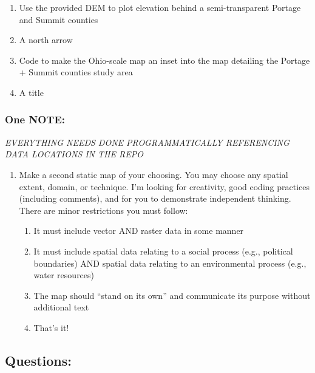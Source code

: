 \documentclass[]{article}
\providecommand{\tightlist}{%
  \setlength{\itemsep}{0pt}\setlength{\parskip}{0pt}}
\begin{document}
\begin{enumerate}
\def\labelenumi{\arabic{enumi}.}
\tightlist
\item
  Use the provided DEM to plot elevation behind a semi-transparent
  Portage and Summit counties
\item
  A north arrow
\item
  Code to make the Ohio-scale map an inset into the map detailing the
  Portage + Summit counties study area
\item
  A title
\end{enumerate}

\subsubsection{One NOTE:}\label{one-note}

\emph{EVERYTHING NEEDS DONE PROGRAMMATICALLY REFERENCING DATA LOCATIONS
IN THE REPO}

\begin{enumerate}
\def\labelenumi{\arabic{enumi}.}
\setcounter{enumi}{1}
\tightlist
\item
  Make a second static map of your choosing. You may choose any spatial
  extent, domain, or technique. I'm looking for creativity, good coding
  practices (including comments), and for you to demonstrate independent
  thinking. There are minor restrictions you must follow:

  \begin{enumerate}
  \def\labelenumii{\arabic{enumii}.}
  \tightlist
  \item
    It must include vector AND raster data in some manner
  \item
    It must include spatial data relating to a social process (e.g.,
    political boundaries) AND spatial data relating to an environmental
    process (e.g., water resources)
  \item
    The map should ``stand on its own'' and communicate its purpose
    without additional text
  \item
    That's it!
  \end{enumerate}
\end{enumerate}

\subsection{Questions:}\label{questions}
\end{document}
